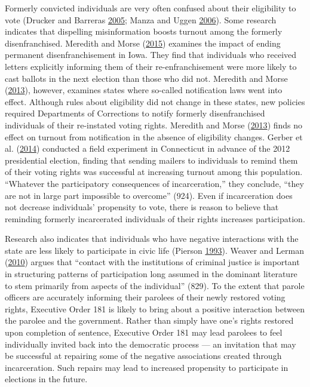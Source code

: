 \documentclass[
  12pt,
]{article}
\begin{document}
Formerly convicted individuals are very often confused about their eligibility to vote (Drucker and Barreras \protect\hyperlink{ref-Drucker2005}{2005}; Manza and Uggen \protect\hyperlink{ref-locked_out}{2006}). Some research indicates that dispelling misinformation boosts turnout among the formerly disenfranchised. Meredith and Morse (\protect\hyperlink{ref-Meredith2015}{2015}) examines the impact of ending permanent disenfranchisement in Iowa. They find that individuals who received letters explicitly informing them of their re-enfranchisement were more likely to cast ballots in the next election than those who did not. Meredith and Morse (\protect\hyperlink{ref-Meredith2013}{2013}), however, examines states where so-called notification laws went into effect. Although rules about eligibility did not change in these states, new policies required Departments of Corrections to notify formerly disenfranchised individuals of their re-instated voting rights. Meredith and Morse (\protect\hyperlink{ref-Meredith2013}{2013}) finds no effect on turnout from notification in the absence of eligibility changes. Gerber et al. (\protect\hyperlink{ref-Gerber2014}{2014}) conducted a field experiment in Connecticut in advance of the 2012 presidential election, finding that sending mailers to individuals to remind them of their voting rights was successful at increasing turnout among this population. ``Whatever the participatory consequences of incarceration,'' they conclude, ``they are not in large part impossible to overcome'' (924). Even if incarceration does not decrease individuals' propensity to vote, there is reason to believe that reminding formerly incarcerated individuals of their rights increases participation.

Research also indicates that individuals who have negative interactions with the state are less likely to participate in civic life (Pierson \protect\hyperlink{ref-Pierson1993}{1993}). Weaver and Lerman (\protect\hyperlink{ref-Weaver2010}{2010}) argues that ``contact with the institutions of criminal justice is important in structuring patterns of participation long assumed in the dominant literature to stem primarily from aspects of the individual'' (829). To the extent that parole officers are accurately informing their parolees of their newly restored voting rights, Executive Order 181 is likely to bring about a positive interaction between the parolee and the government. Rather than simply have one's rights restored upon completion of sentence, Executive Order 181 may lead parolees to feel individually invited back into the democratic process --- an invitation that may be successful at repairing some of the negative associations created through incarceration. Such repairs may lead to increased propensity to participate in elections in the future.
\end{document}
